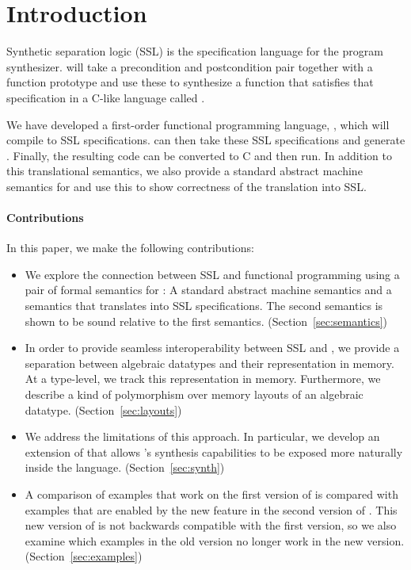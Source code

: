 \section{Introduction}

Synthetic separation logic (SSL) is the specification language for the \SuSLik{} program synthesizer. \SuSLik{} will take a precondition and postcondition pair together
with a function prototype and use these to synthesize a function that satisfies that specification in a C-like language called \SuSLang.

We have developed a first-order functional programming language, \Pika, which will compile to SSL specifications. \SuSLik{} can then take these SSL specifications and generate \SuSLang. Finally, the resulting \SuSLang{} code can be converted to C and then run. In addition to this translational semantics, we also provide a standard abstract machine semantics for \Pika{} and use this to show correctness of the translation into SSL.

\paragraph{Contributions} In this paper, we make the following contributions:
\begin{itemize}
  \item We explore the connection between SSL and functional programming using a pair of formal semantics for \Pika: A standard abstract machine semantics and a
    semantics that translates \Pika{} into SSL specifications. The second semantics is shown to be sound relative to the first semantics. (Section~\ref{sec:semantics})

  \item In order to provide seamless interoperability between SSL and \Pika, we provide a separation between algebraic datatypes and their representation in memory.
    At a type-level, we track this representation in memory. Furthermore, we describe a kind of polymorphism over memory layouts of an algebraic datatype. (Section~\ref{sec:layouts})

  \item We address the limitations of this approach. In particular, we develop an extension of \Pika{} that allows \SuSLik's synthesis capabilities to be exposed more naturally inside the \Pika{} language. (Section~\ref{sec:synth})

  \item A comparison of examples that work on the first version of \Pika{} is compared with examples that are enabled by the new feature in the second version of \Pika. This new version of \Pika{} is not backwards compatible with the first version, so we also examine which examples in the old version no longer work in the new version. (Section~\ref{sec:examples})
\end{itemize}


